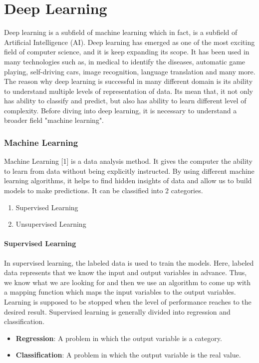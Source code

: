 \chapter{Deep Learning}

Deep learning is a subfield of machine learning which in fact, is a subfield of Artificial Intelligence (AI). Deep learning has emerged as one of the most exciting field of computer science, and it is keep expanding its scope. It has been used in many technologies such as, in medical to identify the diseases, automatic game playing, self-driving cars, image recognition, language translation and many more. The reason why deep learning is successful in many different domain is its ability to understand multiple levels of representation of data. Its mean that, it not only has ability to classify and predict, but also has ability to learn different level of complexity. Before diving into deep learning, it is necessary to understand a broader field "machine learning".

\subsection{Machine Learning}

Machine Learning [1] is a data analysis method. It gives the computer the ability to learn from data without being explicitly instructed. By using different machine learning algorithms, it helps to find hidden insights of data and allow us to build models to make predictions. It can be classified into 2 categories.

\begin{enumerate}
	\item Supervised Learning
	\item Unsupervised Learning
\end{enumerate}

\subsubsection{Supervised Learning}

In supervised learning, the labeled data is used to train the models. Here, labeled data represents that we know the input and output variables in advance. Thus, we know what we are looking for and then we use an algorithm to come up with a mapping function which maps the input variables to the output variables. Learning is supposed to be stopped when the level of performance reaches to the desired result. Supervised learning is generally divided into regression and classification.
\begin{itemize}
	\item \textbf{Regression}: A problem in which the output variable is a category.
	\item \textbf{Classification}: A problem in which the output variable is the real value.
\end{itemize}

